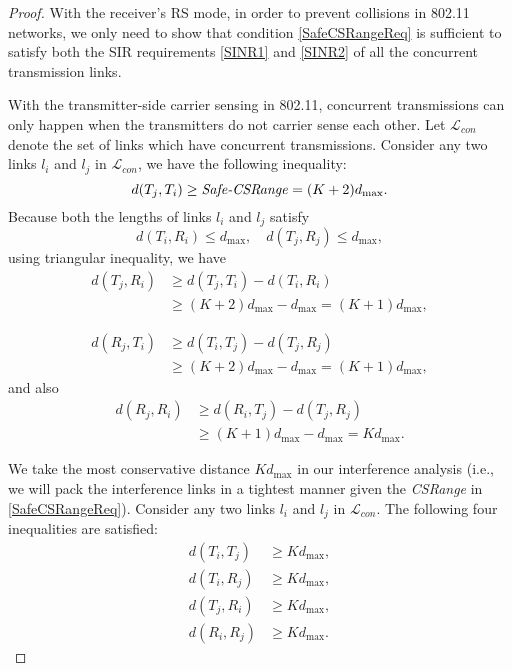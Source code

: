 \documentclass[conference]{IEEEtran}
\begin{document}
\begin{proof}
With the receiver's RS mode, in order to prevent collisions in
802.11 networks, we only need to show that condition
\eqref{SafeCSRangeReq} is suff\/icient to satisfy both the SIR
requirements \eqref{SINR1} and \eqref{SINR2} of all the concurrent
transmission links.

With the transmitter-side carrier sensing in 802.11, concurrent
transmissions can only happen when the transmitters do not carrier
sense each other. Let $\mathcal{L}_{con}$ denote the set of links
which have concurrent transmissions. Consider any two links $l_i$
and $l_j$ in $\mathcal{L}_{con}$, we have the following inequality:
\begin{equation}
d(T_j,T_i)\geq\text{\emph{Safe-CSRange}}=(K+2)d_{\max}.
\end{equation}
Because both the lengths of links $l_i$ and $l_j$ satisfy
\begin{equation}
d(T_i,R_i)\leq d_{\max}, \quad d(T_j,R_j)\leq d_{\max},\nonumber
\end{equation}
using triangular inequality, we have
\begin{align}
d(T_j,R_i)&\geq d(T_j,T_i)-d(T_i,R_i)\nonumber\\
&\geq (K+2)d_{\max }-d_{\max }=(K+1)d_{\max },
\end{align}

\begin{align}
d(R_j,T_i)&\geq d(T_i,T_j)-d(T_j,R_j)\nonumber\\
&\geq (K+2)d_{\max }-d_{\max }=(K+1)d_{\max },
\end{align}
and also
\begin{align}
d(R_j,R_i)&\geq d(R_i,T_j)-d(T_j,R_j)\nonumber\\
&\geq (K+1)d_{\max }-d_{\max }=Kd_{\max }.
\end{align}

We take the most conservative distance $Kd_{\max }$ in our
interference analysis (i.e., we will pack the interference links in
a tightest manner given the \emph{CSRange} in
\eqref{SafeCSRangeReq}). Consider any two links $l_i$ and $l_j$ in
$\mathcal{L}_{con}$. The following four inequalities are
satisf\/ied:
\begin{align}
d(T_i,T_j)&\geq Kd_{\max },\\
d(T_i,R_j)&\geq Kd_{\max },\\
d(T_j,R_i)&\geq Kd_{\max },\\
d(R_i,R_j)&\geq Kd_{\max }.
\end{align}


\end{proof}
\end{document}
